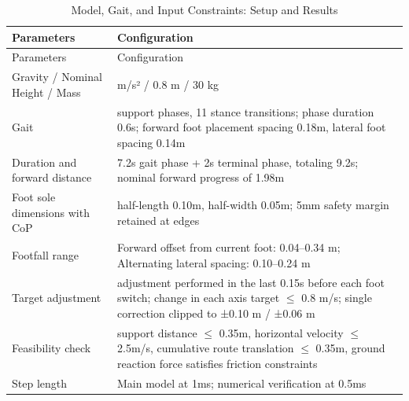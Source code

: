 \FloatBarrier\begingroup\small\setlength{\tabcolsep}{2.5pt}
\begin{longtable}[]{@{}
  >{\raggedright\arraybackslash}p{}
  >{\raggedright\arraybackslash}p{}@{}}
\caption{Model, Gait, and Input Constraints: Setup and Results}\label{tab:s17-2}\tabularnewline
\toprule\noalign{}
\begin{minipage}[b]{\linewidth}\raggedright
Parameters
\end{minipage} & \begin{minipage}[b]{\linewidth}\raggedright
Configuration
\end{minipage} \\
\midrule\noalign{}
\endfirsthead
\toprule\noalign{}
\begin{minipage}[b]{\linewidth}\raggedright
Parameters
\end{minipage} & \begin{minipage}[b]{\linewidth}\raggedright
Configuration
\end{minipage} \\
\midrule\noalign{}
\endhead
\bottomrule\noalign{}
\endlastfoot
Gravity / Nominal Height / Mass & 9.81 m/s² / 0.8 m / 30 kg \\
Gait & 12 support phases, 11 stance transitions; phase duration 0.6s; forward foot placement spacing 0.18m, lateral foot spacing 0.14m \\
Duration and forward distance & 7.2s gait phase + 2s terminal phase, totaling 9.2s; nominal forward progress of 1.98m \\
Foot sole dimensions with CoP & half-length 0.10m, half-width 0.05m; 5mm safety margin retained at edges \\
Footfall range & Forward offset from current foot: 0.04–0.34 m; Alternating lateral spacing: 0.10–0.24 m \\
Target adjustment & adjustment performed in the last 0.15s before each foot switch; change in each axis target \(\leq\) 0.8 m/s; single correction clipped to ±0.10 m / ±0.06 m \\
Feasibility check & support distance \(\leq\) 0.35m, horizontal velocity \(\leq\) 2.5m/s, cumulative route translation \(\leq\) 0.35m, ground reaction force satisfies friction constraints \\
Step length & Main model at 1ms; numerical verification at 0.5ms \\
\end{longtable}\endgroup

